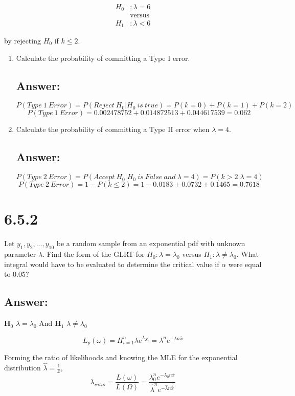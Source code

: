 \documentclass[svgnames]{article}
\begin{document}
\begin{align*}
    H_0&: \lambda =6\\
    &\text{versus}\\
    H_1 &: \lambda < 6
\end{align*}

by rejecting $H_0$ if $k \leq 2$.

\begin{enumerate}[label = (\alph*)]
    \item Calculate the probability of committing a Type I error. 
    \subsection*{Answer:}
    $$P(Type\ 1\ Error)=P(Reject\ H_0|H_0\ is\ true)=P(k=0)+P(k=1)+P(k=2)$$
    $$P(Type\ 1\ Error)=0.002478752 + 0.014872513 + 0.044617539=0.062$$
    \item Calculate the probability of committing a Type II error when $\lambda = 4$.
    \subsection*{Answer:}
    $$P(Type\ 2\ Error)=P(Accept\ H_0|H_0\ is\ False\ and \ \lambda=4)=P(k > 2 | \lambda=4)$$
    $$P(Type\ 2\ Error) = 1 - P(k \leq 2)= 1- 0.0183 + 0.0732 + 0.1465 = 0.7618$$
\end{enumerate}

\section{6.5.2}
 Let $y_1, y_2,..., y_{10}$ be a random sample from an exponential pdf with unknown parameter $\lambda$. Find the form of the GLRT for $H_0: \lambda = \lambda_0$ versus $H_1: \lambda \neq \lambda_0$. What integral would have to be evaluated to determine the critical value if $\alpha$ were equal to 0.05?
\subsection*{Answer:}
\begin{center}
\textbf{H$_0$} $\lambda = \lambda_{0}$ And 
\textbf{H$_1$} $\lambda \neq \lambda_{0}$
\end{center}

$$L_p(\omega)=\Pi_{i=1}^{n}\lambda e^{\lambda_{X_{i}}} = \lambda^ne^{-\lambda n \bar{x}}$$

Forming the ratio of likelihoods and knowing the MLE for the exponential distribution $\hat{\lambda}=\frac{1}{\bar{x}}$,
$$\lambda_{ratio}=\frac{L(\omega)}{L(\Omega)}=\frac{ \lambda_{0}^ne^{-\lambda_{0} n \bar{x}}}{\hat{\lambda}^ne^{-\hat{\lambda} n \bar{x}}} $$
\end{document}
